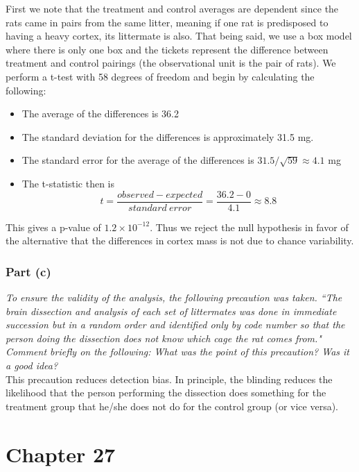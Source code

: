 \documentclass[11pt]{article}
\begin{document}
First we note that the treatment and control averages are dependent since the rats came in pairs from the same litter, meaning if one rat is predisposed to having a heavy cortex, its littermate is also.  That being said, we use a box model where there is only one box and the tickets represent the difference between treatment and control pairings (the observational unit is the pair of rats).  We perform a t-test with 58 degrees of freedom and begin by calculating the following:
\begin{itemize}
	\item The average of the differences is 36.2
	\item The standard deviation for the differences is approximately 31.5 mg.
	\item The standard error for the average of the differences is $ 31.5/\sqrt{59} \approx 4.1 $ mg
	\item The t-statistic then is $$ t = \dfrac{observed-expected}{standard \ error} = \dfrac{36.2-0}{4.1} \approx 8.8 $$
\end{itemize}
This gives a p-value of $ 1.2 \times 10^{-12} $.  Thus we reject the null hypothesis in favor of the alternative that the differences in cortex mass is not due to chance variability.

\subsubsection*{Part (c)}
\textit{To ensure the validity of the analysis, the following precaution was taken.
``The brain dissection and analysis of each set of littermates was done in immediate succession but in a random order and identified only by code number so that the person doing the dissection does not know which cage the rat comes from."
Comment briefly on the following: What was the point of this precaution?
Was it a good idea?}\\

This precaution reduces detection bias.  In principle, the blinding reduces the likelihood that the person performing the dissection does something for the treatment group that he/she does not do for the control group (or vice versa).


\section*{Chapter 27}
\end{document}
